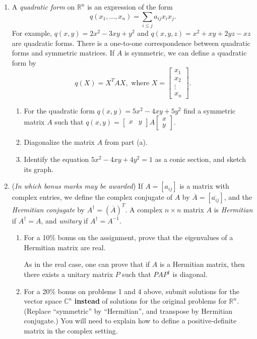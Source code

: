 \documentclass[letterpaper,12pt]{article}
\newcommand{\R}{\mathbb{R}}
\newcommand{\C}{\mathbb{C}}
\begin{document}
\begin{enumerate}
 \item A {\em quadratic form} on $\R^n$ is an expression of the form
 \[
 q(x_1,\ldots, x_n) = \sum_{i\leq j}a_{ij}x_ix_j.
 \]
 For example, $q(x,y) = 2x^2-3xy+y^2$ and $q(x,y,z) = x^2+xy+2yz-xz$ are quadratic forms. There is a one-to-one correspondence between quadratic forms and symmetric matrices. If $A$ is symmetric, we can define a quadratic form by
 \[
 q(X) = X^TAX, \text{ where } X = \begin{bmatrix}
 x_1\\x_2\\\vdots\\x_n
 \end{bmatrix}.
 \]
 \begin{enumerate}
 \item For the quadratic form $q(x,y)=5x^2-4xy+5y^2$ find a symmetric matrix $A$ such that $q(x,y)=\begin{bmatrix}x&y\end{bmatrix}A\begin{bmatrix}x\\y\end{bmatrix}$.
 \item Diagonalize the matrix $A$ from part (a).
 \item Identify the equation $5x^2-4xy+4y^2=1$ as a conic section, and sketch its graph.
 \end{enumerate}
 \item ({\em In which bonus marks may be awarded}) If $A = [a_{ij}]$ is a matrix with complex entries, we define the complex conjugate of $A$ by $\overline{A} = [\overline{a_{ij}}]$, and the {\em Hermitian conjugate} by $A^\dagger = (\overline{A})^T$. A complex $n\times n$ matrix $A$ is {\em Hermitian} if $A^\dagger = A$, and {\em unitary} if $A^\dagger =A^{-1}$.
 \begin{enumerate}
 \item For a 10\% bonus on the assignment, prove that the eigenvalues of a Hermitian matrix are real.
 
 As in the real case, one can prove that if $A$ is a Hermitian matrix, then there exists a unitary matrix $P$ such that $PAP^\dagger$ is diagonal.
 \item For a 20\% bonus on problems 1 and 4 above, submit solutions for the vector space $\C^n$ {\bf instead} of solutions for the original problems for $\R^n$. (Replace ``symmetric'' by ``Hermitian'', and transpose  by Hermitian conjugate.)  You will need to explain how to define a positive-definite matrix in the complex setting.
 \end{enumerate}
 \end{enumerate}
\end{document}
